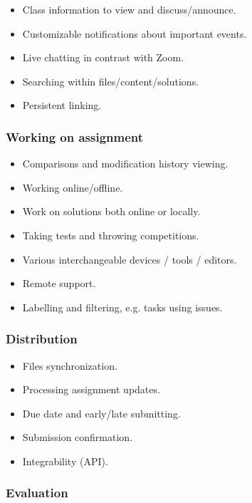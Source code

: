 \begin{itemize}
\item
  {Class information to view and discuss/announce.}
\item
  {Customizable notifications about important events.}
\item
  {Live chatting in contrast with Zoom.}
\item
  {Searching within files/content/solutions.}
\item
  {Persistent linking.}
\end{itemize}

\subsubsection{Working on assignment}

\begin{itemize}
\item
  {Comparisons and modification history viewing.}
\item
  {Working online/offline.}
\item
  {Work on solutions both online or locally.}
\item
  {Taking tests and throwing competitions.}
\item
  {Various interchangeable devices / tools / editors.}
\item
  {Remote support.}
\item
  {Labelling and filtering, e.g. tasks using issues.}
\end{itemize}

\subsubsection{Distribution}

\begin{itemize}
\item
  {Files synchronization.}
\item
  {Processing assignment updates.}
\item
  {Due date and early/late submitting.}
\item
  {Submission confirmation.}
\item
  {Integrability (API).}
\end{itemize}

\subsubsection{Evaluation}

